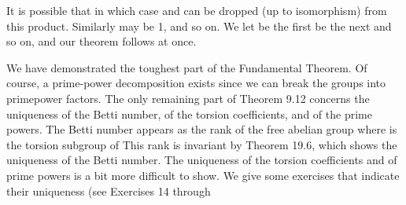 \documentclass[11pt,oneside]{article}
\begin{document}
\begin{BookBody}
It is possible that  in which case  and can be dropped (up to isomorphism) from this product. Similarly may be 1, and so on. We let  be the first  be the next  and so on, and our theorem follows at once.

We have demonstrated the toughest part of the Fundamental Theorem. Of course, a prime-power decomposition exists since we can break the groups  into primepower factors. The only remaining part of Theorem 9.12 concerns the uniqueness of the Betti number, of the torsion coefficients, and of the prime powers. The Betti number appears as the rank of the free abelian group  where  is the torsion subgroup of  This rank is invariant by Theorem 19.6, which shows the uniqueness of the Betti number. The uniqueness of the torsion coefficients and of prime powers is a bit more difficult to show. We give some exercises that indicate their uniqueness (see Exercises 14 through \BookEnd{\blacklozenge}

\end{BookBody}

\BookNarrativefalse
\end{document}
